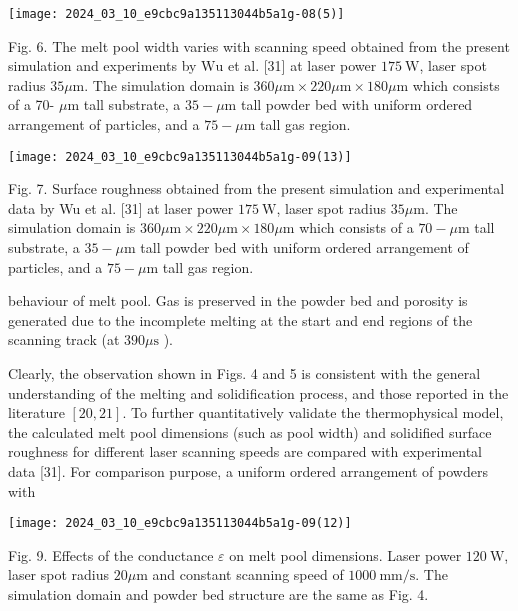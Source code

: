 \documentclass[10pt]{article}
\begin{document}
\begin{center}
\texttt{[image: 2024\_03\_10\_e9cbc9a135113044b5a1g-08(5)]}
\end{center}

Fig. 6. The melt pool width varies with scanning speed obtained from the present simulation and experiments by $\mathrm{Wu}$ et al. [31] at laser power $175 \mathrm{~W}$, laser spot radius $35 \mu \mathrm{m}$. The simulation domain is $360 \mu \mathrm{m} \times 220 \mu \mathrm{m} \times 180 \mu \mathrm{m}$ which consists of a 70- $\mu \mathrm{m}$ tall substrate, a $35-\mu \mathrm{m}$ tall powder bed with uniform ordered arrangement of particles, and a $75-\mu \mathrm{m}$ tall gas region.

\begin{center}
\texttt{[image: 2024\_03\_10\_e9cbc9a135113044b5a1g-09(13)]}
\end{center}

Fig. 7. Surface roughness obtained from the present simulation and experimental data by Wu et al. [31] at laser power $175 \mathrm{~W}$, laser spot radius $35 \mu \mathrm{m}$. The simulation domain is $360 \mu \mathrm{m} \times 220 \mu \mathrm{m} \times 180 \mu \mathrm{m}$ which consists of a $70-\mu \mathrm{m}$ tall substrate, a $35-\mu \mathrm{m}$ tall powder bed with uniform ordered arrangement of particles, and a $75-\mu \mathrm{m}$ tall gas region.

behaviour of melt pool. Gas is preserved in the powder bed and porosity is generated due to the incomplete melting at the start and end regions of the scanning track (at $390 \mu \mathrm{s}$ ).

Clearly, the observation shown in Figs. 4 and 5 is consistent with the general understanding of the melting and solidification process, and those reported in the literature $[20,21]$. To further quantitatively validate the thermophysical model, the calculated melt pool dimensions (such as pool width) and solidified surface roughness for different laser scanning speeds are compared with experimental data [31]. For comparison purpose, a uniform ordered arrangement of powders with

\begin{center}
\texttt{[image: 2024\_03\_10\_e9cbc9a135113044b5a1g-09(12)]}
\end{center}

Fig. 9. Effects of the conductance $\varepsilon$ on melt pool dimensions. Laser power $120 \mathrm{~W}$, laser spot radius $20 \mu \mathrm{m}$ and constant scanning speed of $1000 \mathrm{~mm} / \mathrm{s}$. The simulation domain and powder bed structure are the same as Fig. 4.
\end{document}
